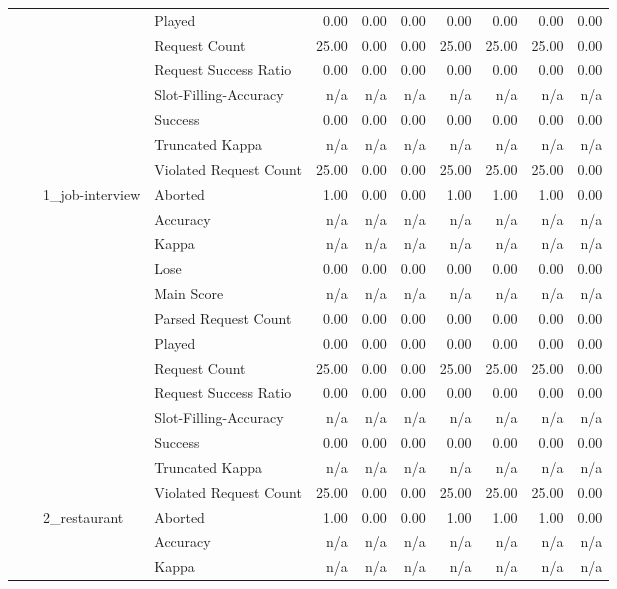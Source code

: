 \begin{tabular}{llllrrrrrrr}
 &  &  & Played & 0.00 & 0.00 & 0.00 & 0.00 & 0.00 & 0.00 & 0.00 \\
 &  &  & Request Count & 25.00 & 0.00 & 0.00 & 25.00 & 25.00 & 25.00 & 0.00 \\
 &  &  & Request Success Ratio & 0.00 & 0.00 & 0.00 & 0.00 & 0.00 & 0.00 & 0.00 \\
 &  &  & Slot-Filling-Accuracy & n/a & n/a & n/a & n/a & n/a & n/a & n/a \\
 &  &  & Success & 0.00 & 0.00 & 0.00 & 0.00 & 0.00 & 0.00 & 0.00 \\
 &  &  & Truncated Kappa & n/a & n/a & n/a & n/a & n/a & n/a & n/a \\
 &  &  & Violated Request Count & 25.00 & 0.00 & 0.00 & 25.00 & 25.00 & 25.00 & 0.00 \\
\cline{3-11}
 &  & \multirow[t]{13}{*}{1_job-interview} & Aborted & 1.00 & 0.00 & 0.00 & 1.00 & 1.00 & 1.00 & 0.00 \\
 &  &  & Accuracy & n/a & n/a & n/a & n/a & n/a & n/a & n/a \\
 &  &  & Kappa & n/a & n/a & n/a & n/a & n/a & n/a & n/a \\
 &  &  & Lose & 0.00 & 0.00 & 0.00 & 0.00 & 0.00 & 0.00 & 0.00 \\
 &  &  & Main Score & n/a & n/a & n/a & n/a & n/a & n/a & n/a \\
 &  &  & Parsed Request Count & 0.00 & 0.00 & 0.00 & 0.00 & 0.00 & 0.00 & 0.00 \\
 &  &  & Played & 0.00 & 0.00 & 0.00 & 0.00 & 0.00 & 0.00 & 0.00 \\
 &  &  & Request Count & 25.00 & 0.00 & 0.00 & 25.00 & 25.00 & 25.00 & 0.00 \\
 &  &  & Request Success Ratio & 0.00 & 0.00 & 0.00 & 0.00 & 0.00 & 0.00 & 0.00 \\
 &  &  & Slot-Filling-Accuracy & n/a & n/a & n/a & n/a & n/a & n/a & n/a \\
 &  &  & Success & 0.00 & 0.00 & 0.00 & 0.00 & 0.00 & 0.00 & 0.00 \\
 &  &  & Truncated Kappa & n/a & n/a & n/a & n/a & n/a & n/a & n/a \\
 &  &  & Violated Request Count & 25.00 & 0.00 & 0.00 & 25.00 & 25.00 & 25.00 & 0.00 \\
\cline{3-11}
 &  & \multirow[t]{13}{*}{2_restaurant} & Aborted & 1.00 & 0.00 & 0.00 & 1.00 & 1.00 & 1.00 & 0.00 \\
 &  &  & Accuracy & n/a & n/a & n/a & n/a & n/a & n/a & n/a \\
 &  &  & Kappa & n/a & n/a & n/a & n/a & n/a & n/a & n/a \\

\end{tabular}
